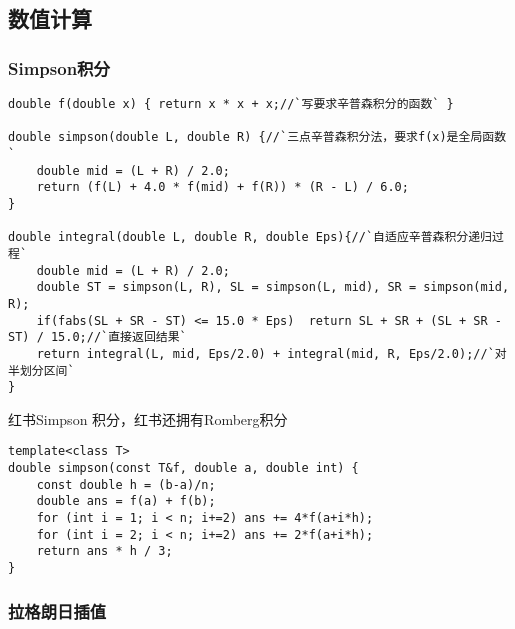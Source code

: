\subsection{数值计算}

\subsubsection{Simpson积分}

\begin{lstlisting}
double f(double x) { return x * x + x;//`写要求辛普森积分的函数` }

double simpson(double L, double R) {//`三点辛普森积分法，要求f(x)是全局函数`
    double mid = (L + R) / 2.0;
    return (f(L) + 4.0 * f(mid) + f(R)) * (R - L) / 6.0;
}

double integral(double L, double R, double Eps){//`自适应辛普森积分递归过程`
    double mid = (L + R) / 2.0;
    double ST = simpson(L, R), SL = simpson(L, mid), SR = simpson(mid, R);
    if(fabs(SL + SR - ST) <= 15.0 * Eps)  return SL + SR + (SL + SR - ST) / 15.0;//`直接返回结果`
    return integral(L, mid, Eps/2.0) + integral(mid, R, Eps/2.0);//`对半划分区间`
}
\end{lstlisting}
红书Simpson 积分，红书还拥有Romberg积分

\begin{lstlisting}
template<class T>
double simpson(const T&f, double a, double int) {
    const double h = (b-a)/n;
    double ans = f(a) + f(b);
    for (int i = 1; i < n; i+=2) ans += 4*f(a+i*h);
    for (int i = 2; i < n; i+=2) ans += 2*f(a+i*h);
    return ans * h / 3;
}
\end{lstlisting}

\subsubsection{拉格朗日插值}


